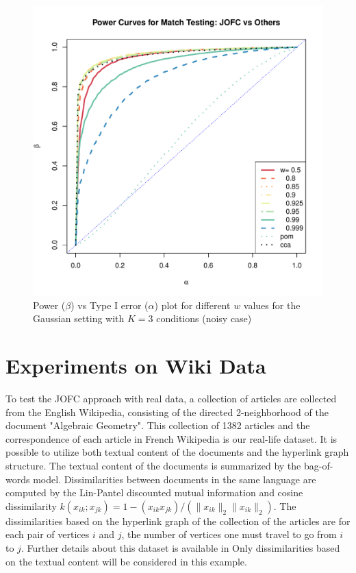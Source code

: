 \documentclass[11pt]{article} %
\begin{document}
 



\begin{figure}
\includegraphics[scale=0.95]{MVN-FC-Tradeoff-OOS-3cond.pdf}
\caption{Power ($\beta$) vs Type I error ($\alpha$) plot for different $w$ values for the Gaussian setting with $K=3$ conditions (noisy case)}
\label{fig:MVN-c001-power-w-Kcond}
\end{figure}

\section{Experiments on Wiki Data}
To test the JOFC approach with real data, a collection of articles are collected from the English Wikipedia, consisting of the
 directed 2-neighborhood of the document "Algebraic Geometry". 
   This  collection of 1382 articles and the correspondence of each article in French 
Wikipedia is our real-life dataset. It is possible to utilize both textual content of the documents and the hyperlink graph structure. The textual content of the documents is summarized by the bag-of-words model. Dissimilarities between documents  in the same language are computed by the Lin-Pantel discounted mutual information \cite{LinPantel,PantelLin}
 and cosine dissimilarity $k(x_{ik}; x_{jk}) = 1 - (x_{ik} x_{jk})/(\|x_{ik}\|_2\|x_{ik}\|_2)$. 
 The dissimilarities based on the hyperlink graph of the collection of the articles are 
 for each pair of vertices $i$ and $j$, the number of vertices one must travel to go from $i$ to $j$.  Further details about this dataset is available in \cite{Zhiliang_disparate}     
Only  dissimilarities based on the textual content will be considered in this example.
   
\end{document}
